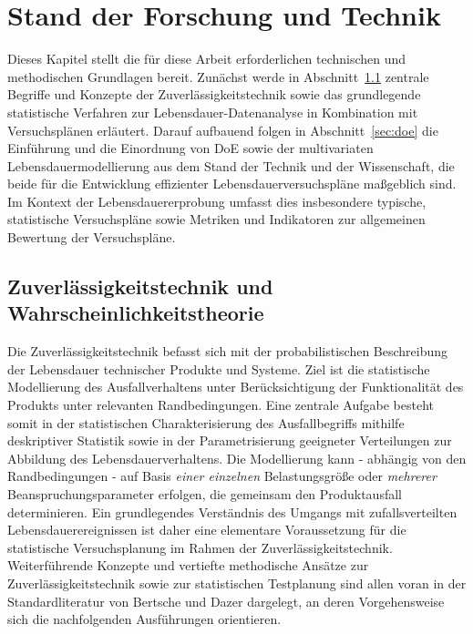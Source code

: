 \chapter{Stand der Forschung und Technik} \label{chap:stand}

Dieses Kapitel stellt die für diese Arbeit erforderlichen technischen und methodischen Grundlagen bereit. Zunächst werde in Abschnitt~\ref{sec:zuv} zentrale Begriffe und Konzepte der Zuverlässigkeitstechnik sowie das grundlegende statistische Verfahren zur Lebensdauer-Datenanalyse in Kombination mit Versuchsplänen erläutert.
Darauf aufbauend folgen in Abschnitt~\ref{sec:doe} die Einführung und die Einordnung von \acs{DoE} sowie der multivariaten Lebensdauermodellierung aus dem Stand der Technik und der Wissenschaft, die beide für die Entwicklung effizienter Lebensdauerversuchspläne maßgeblich sind.
Im Kontext der Lebensdauererprobung umfasst dies insbesondere typische, statistische Versuchspläne sowie Metriken und Indikatoren zur allgemeinen Bewertung der Versuchspläne.

\section{Zuverlässigkeitstechnik und Wahrscheinlichkeitstheorie} \label{sec:zuv}
Die Zuverlässigkeitstechnik befasst sich mit der probabilistischen Beschreibung der Lebensdauer technischer Produkte und Systeme.
Ziel ist die statistische Modellierung des Ausfallverhaltens unter Berücksichtigung der Funktionalität des Produkts unter relevanten Randbedingungen.
Eine zentrale Aufgabe besteht somit in der statistischen Charakterisierung des Ausfallbegriffs mithilfe deskriptiver Statistik sowie in der Parametrisierung geeigneter Verteilungen zur Abbildung des Lebensdauerverhaltens.
Die Modellierung kann - abhängig von den Randbedingungen - auf Basis \textit{einer einzelnen} Belastungsgröße oder \textit{mehrerer} Beanspruchungsparameter erfolgen, die gemeinsam den Produktausfall determinieren.
Ein grundlegendes Verständnis des Umgangs mit zufallsverteilten Lebensdauerereignissen ist daher eine elementare Voraussetzung für die statistische Versuchsplanung im Rahmen der Zuverlässigkeitstechnik.
Weiterführende Konzepte und vertiefte methodische Ansätze zur Zuverlässigkeitstechnik sowie zur statistischen Testplanung sind allen voran in der Standardliteratur von Bertsche und Dazer \cite{Bertsche.2022} dargelegt, an deren Vorgehensweise sich die nachfolgenden Ausführungen orientieren.

